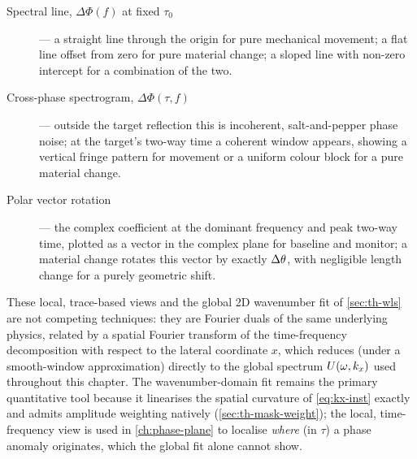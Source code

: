\begin{description}
  \item[Spectral line, $\Delta\Phi(f)$ at fixed $\tau_0$] --- a straight line
    through the origin for pure mechanical movement; a flat line offset from
    zero for pure material change; a sloped line with non-zero intercept for
    a combination of the two.
  \item[Cross-phase spectrogram, $\Delta\Phi(\tau,f)$] --- outside the target
    reflection this is incoherent, salt-and-pepper phase noise; at the
    target's two-way time a coherent window appears, showing a vertical
    fringe pattern for movement or a uniform colour block for a pure material
    change.
  \item[Polar vector rotation] --- the complex coefficient at the dominant
    frequency and peak two-way time, plotted as a vector in the complex
    plane for baseline and monitor; a material change rotates this vector by
    exactly $\Delta \theta$, with negligible length change for a purely geometric
    shift.
\end{description}

These local, trace-based views and the global 2D wavenumber fit of
\cref{sec:th-wls} are not competing techniques: they are Fourier duals of the
same underlying physics, related by a spatial Fourier transform of the
time-frequency decomposition with respect to the lateral coordinate $x$,
which reduces (under a smooth-window approximation) directly to the global
spectrum $U(\omega,k_x)$ used throughout this chapter. The wavenumber-domain
fit remains the primary quantitative tool because it linearises the spatial
curvature of \cref{eq:kx-inst} exactly and admits amplitude weighting
natively (\cref{sec:th-mask-weight}); the local, time-frequency view is used
in \cref{ch:phase-plane} to localise \emph{where} (in $\tau$) a phase
anomaly originates, which the global fit alone cannot show.
